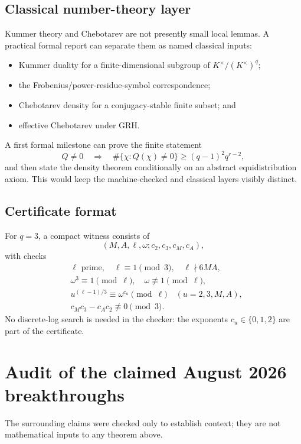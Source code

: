 \documentclass[11pt]{article}
\numberwithin{equation}{section}
\theoremstyle{definition}
\theoremstyle{remark}
\begin{document}
\subsection{Classical number-theory layer}

Kummer theory and Chebotarev are not presently small local lemmas.  A practical formal report
can separate them as named classical inputs:
\begin{itemize}
\item Kummer duality for a finite-dimensional subgroup of \(K^\times/(K^\times)^q\);
\item the Frobenius/power-residue-symbol correspondence;
\item Chebotarev density for a conjugacy-stable finite subset; and
\item effective Chebotarev under GRH.
\end{itemize}
A first formal milestone can prove the finite statement
\[
 Q\ne0\quad\Longrightarrow\quad
 \#\{\chi:Q(\chi)\ne0\}\ge(q-1)^2q^{r-2},
\]
and then state the density theorem conditionally on an abstract equidistribution axiom.  This
would keep the machine-checked and classical layers visibly distinct.

\subsection{Certificate format}

For \(q=3\), a compact witness consists of
\[
 (M,A,\ell,\omega; c_2,c_3,c_M,c_A),
\]
with checks
\begin{align*}
 &\ell\text{ prime},\quad \ell\equiv1\pmod3,
 \quad \ell\nmid6MA,\\
 &\omega^3\equiv1\pmod\ell,\quad \omega\not\equiv1\pmod\ell,\\
 &u^{(\ell-1)/3}\equiv\omega^{c_u}\pmod\ell
 \quad(u=2,3,M,A),\\
 &c_Mc_3-c_Ac_2\not\equiv0\pmod3.
\end{align*}
No discrete-log search is needed in the checker: the exponents \(c_u\in\{0,1,2\}\) are part
of the certificate.

\section{Audit of the claimed August 2026 breakthroughs}
\label{sec:news}

The surrounding claims were checked only to establish context; they are not mathematical
inputs to any theorem above.
\end{document}
